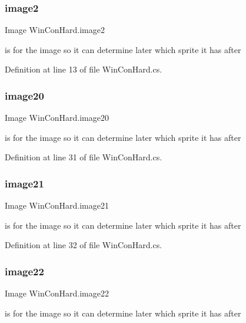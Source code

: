 \subsubsection{\texorpdfstring{image2}{image2}}
{\footnotesize\ttfamily Image Win\+Con\+Hard.\+image2}

is for the image so it can determine later which sprite it has after 

Definition at line 13 of file Win\+Con\+Hard.\+cs.

\mbox{\label{class_win_con_hard_abcc8a61c2ff8494498103aba0fabdf82}} 
\subsubsection{\texorpdfstring{image20}{image20}}
{\footnotesize\ttfamily Image Win\+Con\+Hard.\+image20}

is for the image so it can determine later which sprite it has after 

Definition at line 31 of file Win\+Con\+Hard.\+cs.

\mbox{\label{class_win_con_hard_af274005d2d3ebc0006e43029c684b10c}} 
\subsubsection{\texorpdfstring{image21}{image21}}
{\footnotesize\ttfamily Image Win\+Con\+Hard.\+image21}

is for the image so it can determine later which sprite it has after 

Definition at line 32 of file Win\+Con\+Hard.\+cs.

\mbox{\label{class_win_con_hard_a091e786a059fa910936d2aad9e50b79b}} 
\subsubsection{\texorpdfstring{image22}{image22}}
{\footnotesize\ttfamily Image Win\+Con\+Hard.\+image22}

is for the image so it can determine later which sprite it has after 


